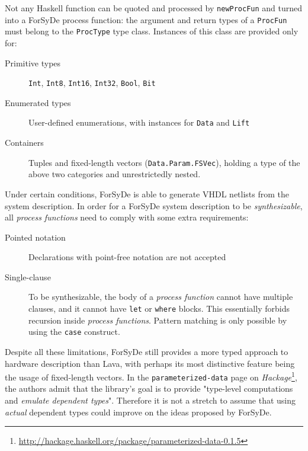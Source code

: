             Not any Haskell function can be quoted and processed by \texttt{newProcFun}
            and turned into a ForSyDe process function:
            the argument and return types of a \texttt{ProcFun} must belong
            to the \texttt{ProcType} type class.
            Instances of this class are provided only for:

            \begin{description}
                \item[Primitive types] \texttt{Int}, \texttt{Int8}, \texttt{Int16},
                    \texttt{Int32}, \texttt{Bool}, \texttt{Bit}
                \item[Enumerated types] User-defined enumerations,
                    with instances for \texttt{Data} and \texttt{Lift}
                \item[Containers] Tuples and fixed-length vectors (\texttt{Data.Param.FSVec}),
                    holding a type of the above two categories and unrestrictedly nested.
            \end{description}

            Under certain conditions, ForSyDe is able to generate \ac{VHDL} netlists from the system description.
            In order for a ForSyDe system description to be \emph{synthesizable},
            all \emph{process functions} need to comply with some extra requirements:

            \begin{description}
                \item[Pointed notation] Declarations with point-free notation are not accepted
                \item[Single-clause] To be synthesizable,
                    the body of a \emph{process function} cannot have multiple clauses,
                    and it cannot have \texttt{let} or \texttt{where} blocks.
                    This essentially forbids recursion inside \emph{process functions}.
                    Pattern matching is only possible by using the \texttt{case} construct.
            \end{description}

            Despite all these limitations,
            ForSyDe still provides a more typed approach to hardware description than Lava,
            with perhaps its most distinctive feature being the usage of fixed-length vectors.
            In the \texttt{parameterized-data} page on
            \emph{Hackage}\footnote{\url{http://hackage.haskell.org/package/parameterized-data-0.1.5}},
            the authors admit that the library's goal is to provide
            "type-level computations and \emph{emulate dependent types}".
            Therefore it is not a stretch to assume that using \emph{actual} dependent types
            could improve on the ideas proposed by ForSyDe.


